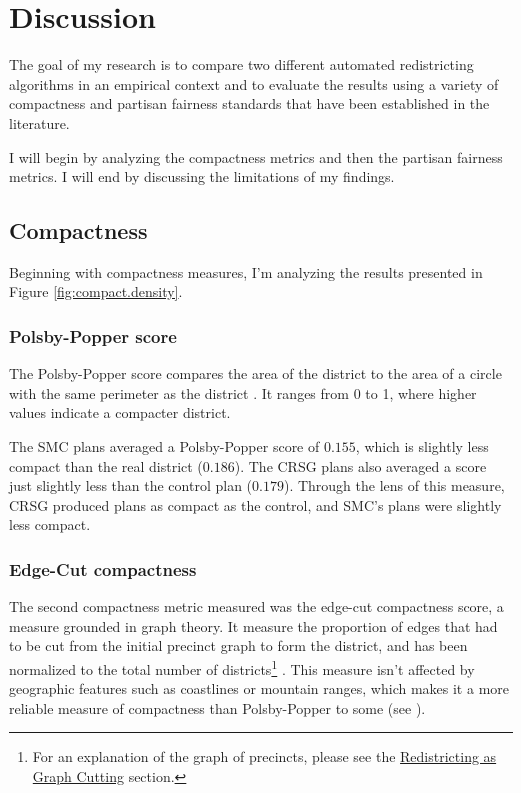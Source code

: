 \section{Discussion}
\label{sec:disc}

The goal of my research is to compare two different automated redistricting algorithms in an empirical context and to evaluate the results using a variety of compactness and partisan fairness standards that have been established in the literature. 

I will begin by analyzing the compactness metrics and then the partisan fairness metrics. I will end by discussing the limitations of my findings. 

\subsection{Compactness}

Beginning with compactness measures, I'm analyzing the results presented in Figure \ref{fig:compact.density}. 

\subsubsection{Polsby-Popper score}

The Polsby-Popper score compares the area of the district to the area of a circle with the same perimeter as the district \parencite{polsby1991}. It ranges from 0 to 1, where higher values indicate a compacter district. 

The SMC plans averaged a Polsby-Popper score of $0.155$, which is slightly less compact than the real district ($0.186$). The CRSG plans also averaged a score just slightly less than the control plan ($0.179$). Through the lens of this measure, CRSG produced plans as compact as the control, and SMC's plans were slightly less compact. 

\subsubsection{Edge-Cut compactness}

The second compactness metric measured was the edge-cut compactness score, a measure grounded in graph theory. It measure the proportion of edges that had to be cut from the initial precinct graph to form the district, and has been normalized to the total number of districts\footnote{For an explanation of the graph of precincts, please see the \hyperref[sec:redistasgraphcut]{Redistricting as Graph Cutting} section.} \parencite{dube2016}. This measure isn't affected by geographic features such as coastlines or mountain ranges, which makes it a more reliable measure of compactness than Polsby-Popper to some (see \textcite{mccartan2020}). 

